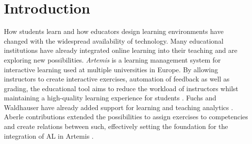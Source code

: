 \documentclass[a4paper,12pt,twoside]{article}
\begin{document}
\setlength{\evensidemargin}{22pt}
\setlength{\oddsidemargin}{22pt}



\lstset{showspaces=false, numbers=left, frame=single, basicstyle=\small}




\fancyhead{}
\pagestyle{fancy}
\fancyhead[LE]{\slshape \leftmark}
\fancyhead[RO]{\slshape \rightmark}
\headheight=15pt

\section{Introduction}

How students learn and how educators design learning environments have changed with the widespread availability of technology. Many educational
institutions have already integrated online learning into their teaching and are exploring new possibilities. \textit{Artemis} is a learning management system for interactive
learning used at multiple universities in Europe.
By allowing instructors to create interactive exercises, automation of feedback as well as grading, the educational tool aims to reduce the
workload of instructors whilst maintaining a high-quality learning experience for students \cite{Krusche_ArTEMiS_An_Automatic_2018}. Fuchs and Waldhauser have already added support
for learning and teaching analytics \cite{fuchs2021,waldhauser2021}. Aberle contributions extended the possibilities to assign exercises to competencies and create relations
between such, effectively setting the foundation for the integration of \ac{AL} in Artemis \cite{aberle2022}.

\end{document}
